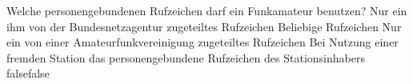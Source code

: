     {Welche personengebundenen Rufzeichen darf ein Funkamateur benutzen?}
    {Nur ein ihm von der Bundesnetzagentur zugeteiltes Rufzeichen}
    {Beliebige Rufzeichen}
    {Nur ein von einer Amateurfunkvereinigung zugeteiltes Rufzeichen}
    {Bei Nutzung einer fremden Station das personengebundene Rufzeichen des Stationsinhabers}
    {false}{false}